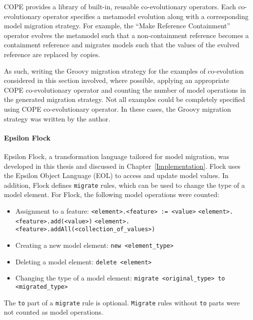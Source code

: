 COPE provides a library of built-in, reusable co-evolutionary operators. Each co-evolutionary operator specifies a metamodel evolution along with a corresponding model migration strategy. For example, the ``Make Reference Containment'' operator evolves the metamodel such that a non-containment reference becomes a containment reference and migrates models such that the values of the evolved reference are replaced by copies.

As such, writing the Groovy migration strategy for the examples of co-evolution considered in this section involved, where possible, applying an appropriate COPE co-evolutionary operator and counting the number of model operations in the generated migration strategy. Not all examples could be completely specified using COPE co-evolutionary operator. In these cases, the Groovy migration strategy was written by the author.


\paragraph{Epsilon Flock}
Epsilon Flock, a transformation language tailored for model migration, was developed in this thesis and discussed in Chapter~\ref{Implementation}. Flock uses the Epsilon Object Language (EOL) \cite{kolovos06eol} to access and update model values. In addition, Flock defines \texttt{migrate} rules, which can be used to change the type of a model element. For Flock, the following model operations were counted:

\begin{itemize}
	\item Assignment to a feature:
	\subitem \texttt{<element>.<feature> := <value>} 
	\subitem \texttt{<element>.<feature>.add(<value>)}
	\subitem \texttt{<element>.<feature>.addAll(<collection\_of\_values>)}

	\item Creating a new model element:
	\subitem \texttt{new <element\_type>}
	
	\item Deleting a model element:
	\subitem \texttt{delete <element>}
	
	\item Changing the type of a model element:
	\subitem \texttt{migrate <original_type> to <migrated_type>}
\end{itemize}

The \texttt{to} part of a \texttt{migrate} rule is optional. \texttt{Migrate} rules without \texttt{to} parts were not counted as model operations.


